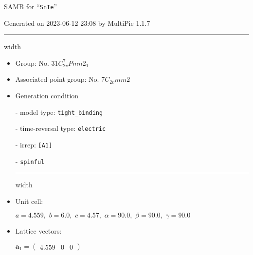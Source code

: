 \documentclass[fleqn,10pt,landscape]{article}
\begin{document}
\setcounter{MaxMatrixCols}{16}

\setlength{\baselineskip}{16pt}
\footnotesize
\begin{center}
\LARGE
SAMB for ``\texttt{SnTe}''
\end{center}
\begin{flushright}
Generated on 2023-06-12 23:08 by MultiPie 1.1.7
\end{flushright}
\vspace{1cm}


 \hfil \hrule height 1mm width \textwidth \hfil

\begin{itemize}
\item Group: No. 31\quad$C_{2v}^{7}$\quad$Pmn2_1$\quad[ orthorhombic ]

\item Associated point group: No. 7\quad$C_{2v}$\quad$mm2$\quad[ orthorhombic ]

\vspace{5mm}

\item Generation condition

\quad - model type: \texttt{tight_binding}

\quad - time-reversal type: \texttt{electric}

\quad - irrep: \texttt{[A1]}

\quad - \texttt{spinful}


 \hfil \hrule height 1mm width \textwidth \hfil

\item Unit cell:

\quad $a=4.559,\,\, b=6.0,\,\, c=4.57,\,\, \alpha=90.0,\,\, \beta=90.0,\,\, \gamma=90.0$

\item Lattice vectors:

\quad $\bm{a}_1=\begin{pmatrix} 4.559 & 0 & 0 \end{pmatrix}$


\end{itemize}
\end{document}
